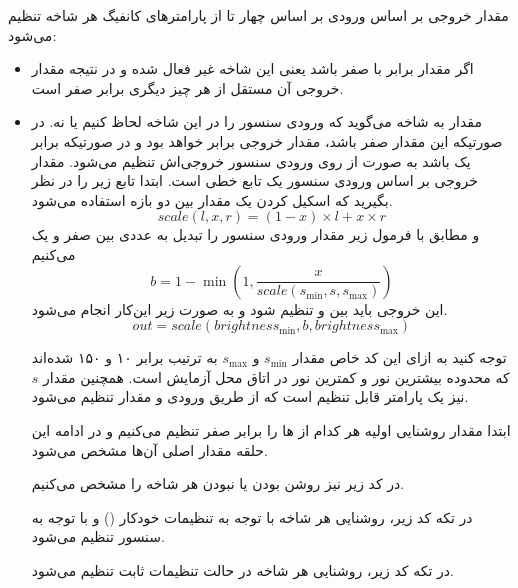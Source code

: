 مقدار خروجی بر اساس ورودی بر اساس چهار تا از پارامتر‌های کانفیگ هر شاخه تنظیم می‌شود:
\begin{itemize}
	\item 
	اگر مقدار
	برابر با صفر باشد یعنی این شاخه غیر فعال شده و در نتیجه مقدار خروجی‌ آن مستقل از هر چیز دیگری برابر صفر است.
	
	\item 
	مقدار
	به شاخه می‌گوید که ورودی سنسور را در این شاخه لحاظ کنیم یا نه. در صورتیکه این مقدار صفر باشد، مقدار خروجی برابر
	خواهد بود و در صورتیکه برابر یک باشد به صورت 
	از روی ورودی سنسور خروجی‌اش تنظیم می‌شود. مقدار خروجی بر اساس ورودی سنسور یک تابع خطی است. ابتدا تابع زیر را در نظر بگیرید که اسکیل کردن یک مقدار
	بین دو بازه استفاده می‌شود.
	$$scale(l, x, r) = (1 - x) \times l + x \times r$$
	 و مطابق با فرمول زیر مقدار ورودی سنسور را تبدیل به عددی بین صفر و یک می‌کنیم
	$$b = 1 - \min(1, \frac{x}{scale(s_{\min} , s , s_{\max})})$$
	این خروجی باید بین 
	و
	تنظیم شود و به صورت زیر این‌کار انجام می‌شود.
	$$out = scale(brightness_{\min}, b, brightness_{\max})$$
	
	توجه کنید به ازای این کد خاص مقدار
	$s_{\min}$
	و
	$s_{\max}$
	به ترتیب برابر ۱۰ و ۱۵۰ شده‌اند که محدوده بیشترین نور و کمترین نور در اتاق محل آزمایش است. همچنین مقدار
	$s$
	نیز یک پارامتر قابل تنظیم است که از طریق ورودی 
	و مقدار
	تنظیم می‌شود.
	
	
	ابتدا مقدار روشنایی اولیه هر کدام از  ها را برابر صفر تنظیم می‌کنیم و در ادامه این حلقه مقدار اصلی آن‌ها مشخص می‌شود.
	\begin{latin}
		
	\end{latin}
	
	در کد زیر نیز روشن بودن یا نبودن هر شاخه را مشخص می‌کنیم.
	\begin{latin}
		
	\end{latin}
	در تکه کد زیر، روشنایی هر شاخه با توجه به تنظیمات خودکار () و با توجه به سنسور تنظیم می‌شود.
	\begin{latin}
		
	\end{latin}
در تکه کد زیر، روشنایی هر شاخه در حالت تنظیمات ثابت تنظیم می‌شود.
	\begin{latin}
	
\end{latin}


\end{itemize}
